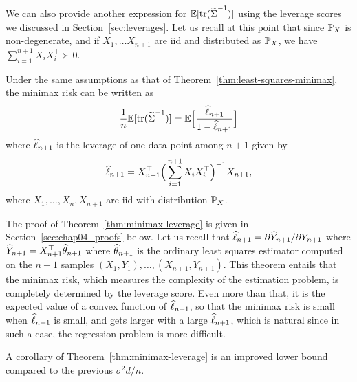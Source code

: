 We can also provide another expression for $\E [\tr (\wt \bSigma^{-1})]$ using the leverage scores we discussed in Section~\ref{sec:leverages}.
Let us recall at this point that since $\P_X$ is non-degenerate, and if $X_1, \ldots X_{n+1}$ are iid and distributed as $\P_X$, we have $\sum_{i=1}^{n+1} X_i X_i^\top \succ 0$.
\begin{theorem}
	\label{thm:minimax-leverage}
	Under the same assumptions as that of Theorem~\ref{thm:least-squares-minimax}, the minimax risk can be written as
	\begin{equation*}
		\frac 1n \E [\tr ( \wt \bSigma^{-1}) ] = \E \Big[ \frac{\wh \ell_{n+1}}{1 - \wh \ell_{n+1}} \Big]
	\end{equation*}
	where $\wh \ell_{n+1}$ is the leverage of one data point among $n+1$ given by
	\begin{equation*}
		\wh \ell_{n+1} = X_{n+1}^\top \Big( \sum_{i=1}^{n+1} X_i X_i^\top \Big)^{-1} X_{n+1},
	\end{equation*}
	where $X_1, \ldots, X_n, X_{n+1}$ are iid with distribution $\P_X$.
\end{theorem}

The proof of Theorem~\ref{thm:minimax-leverage} is given in Section~\ref{sec:chap04_proofs} below.
Let us recall that $\wh \ell_{n+1} = \partial \wh Y_{n+1} / \partial Y_{n+1}$ where $\wh Y_{n+1} = X_{n+1}^\top \wh \theta_{n+1}$ where $\wh \theta_{n+1}$ is the ordinary least squares estimator computed on the $n+1$ samples $(X_1, Y_1), \ldots, (X_{n+1}, Y_{n+1})$. 
This theorem entails that the minimax risk, which measures the complexity of the estimation problem,  is completely determined by the leverage score. 
Even more than that, it is the expected value of a convex function of $\wh \ell_{n+1}$, so that the minimax risk is small when $\wh \ell_{n+1}$ is small, and gets larger with a large $\wh \ell_{n+1}$, which is natural since in such a case, the regression problem is more difficult. 

A corollary of Theorem~\ref{thm:minimax-leverage} is an improved lower bound compared to the previous $\sigma^2 d / n$.


